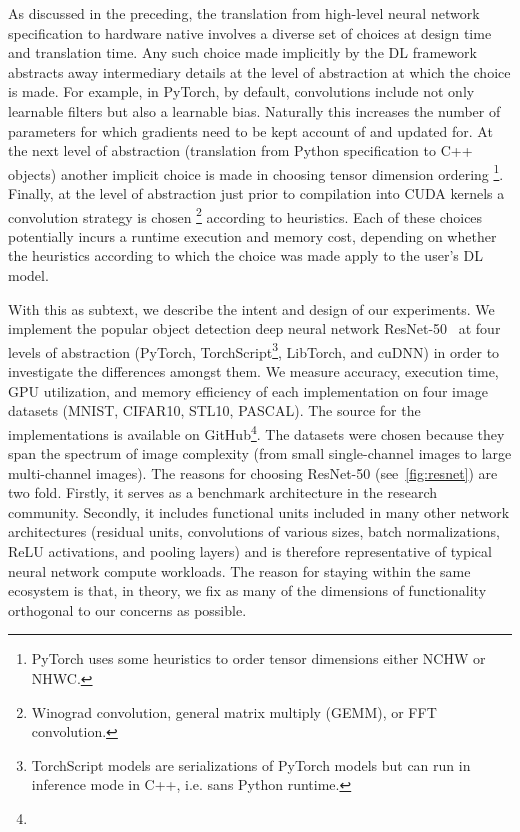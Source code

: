 As discussed in the preceding, the translation from high-level neural network specification to hardware native involves a diverse set of choices at design time and translation time.
Any such choice made implicitly by the DL framework abstracts away intermediary details at the level of abstraction at which the choice is made.
For example, in PyTorch, by default, convolutions include not only learnable filters but also a learnable bias.
Naturally this increases the number of parameters for which gradients need to be kept account of and updated for.
At the next level of abstraction (translation from Python specification to C++ objects) another implicit choice is made in choosing tensor dimension ordering%
\footnote{PyTorch uses some heuristics to order tensor dimensions either NCHW or NHWC.}.
Finally, at the level of abstraction just prior to compilation into CUDA kernels a convolution strategy is chosen%
\footnote{Winograd convolution, general matrix multiply (GEMM), or FFT convolution.} according to heuristics.
Each of these choices potentially incurs a runtime execution and memory cost, depending on whether the heuristics according to which the choice was made apply to the user's DL model.

With this as subtext, we describe the intent and design of our experiments.
We implement the popular object detection deep neural network ResNet-50~\cite{he2015deep} at four levels of abstraction (PyTorch, TorchScript\footnote{TorchScript models are serializations of PyTorch models but can run in inference mode in C++, i.e. sans Python runtime.}, LibTorch, and cuDNN) in order to investigate the differences amongst them.
We measure accuracy, execution time, GPU utilization, and memory efficiency of each implementation on four image datasets (MNIST, CIFAR10, STL10, PASCAL).
The source for the implementations is available on GitHub\footnote{}.
The datasets were chosen because they span the spectrum of image complexity (from small single-channel images to large multi-channel images).
The reasons for choosing ResNet-50 (see~\cref{fig:resnet}) are two fold.
Firstly, it serves as a benchmark architecture in the research community.
Secondly, it includes functional units included in many other network architectures (residual units, convolutions of various sizes, batch normalizations, ReLU activations, and pooling layers) and is therefore representative of typical neural network compute workloads.
The reason for staying within the same ecosystem is that, in theory, we fix as many of the dimensions of functionality orthogonal to our concerns as possible.

